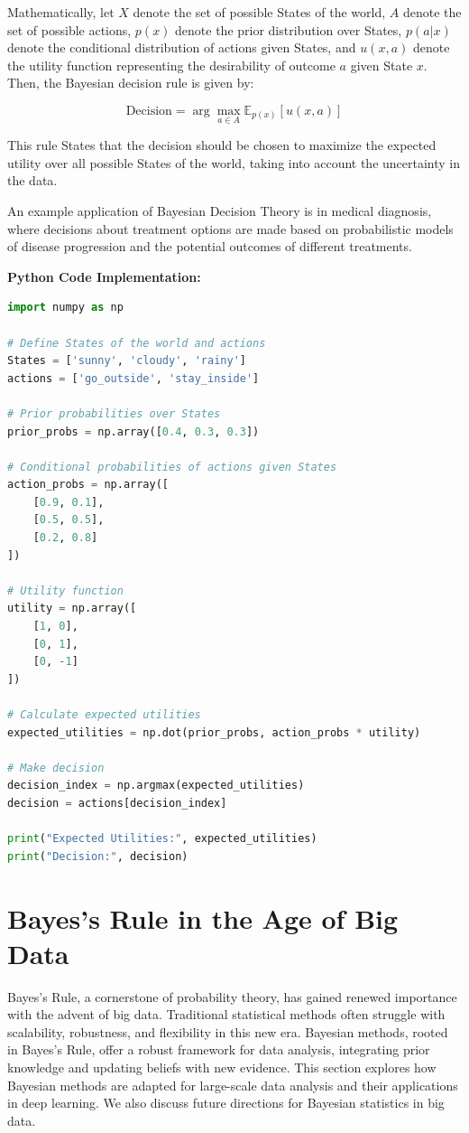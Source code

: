 \documentclass[12pt]{book} %
\begin{document}
Mathematically, let $ X $ denote the set of possible States of the world, $ A $ denote the set of possible actions, $ p(x) $ denote the prior distribution over States, $ p(a|x) $ denote the conditional distribution of actions given States, and $ u(x,a) $ denote the utility function representing the desirability of outcome $ a $ given State $ x $. Then, the Bayesian decision rule is given by:

\[ \text{Decision} = \arg\max_{a \in A} \mathbb{E}_{p(x)}[u(x,a)] \]

This rule States that the decision should be chosen to maximize the expected utility over all possible States of the world, taking into account the uncertainty in the data.

An example application of Bayesian Decision Theory is in medical diagnosis, where decisions about treatment options are made based on probabilistic models of disease progression and the potential outcomes of different treatments.

\textbf{Python Code Implementation:}
\FloatBarrier
\begin{lstlisting}[language=Python, caption=Python Implementation of Bayesian Decision Theory]
import numpy as np

# Define States of the world and actions
States = ['sunny', 'cloudy', 'rainy']
actions = ['go_outside', 'stay_inside']

# Prior probabilities over States
prior_probs = np.array([0.4, 0.3, 0.3])

# Conditional probabilities of actions given States
action_probs = np.array([
    [0.9, 0.1],
    [0.5, 0.5],
    [0.2, 0.8]
])

# Utility function
utility = np.array([
    [1, 0],
    [0, 1],
    [0, -1]
])

# Calculate expected utilities
expected_utilities = np.dot(prior_probs, action_probs * utility)

# Make decision
decision_index = np.argmax(expected_utilities)
decision = actions[decision_index]

print("Expected Utilities:", expected_utilities)
print("Decision:", decision)
\end{lstlisting}


\section{Bayes's Rule in the Age of Big Data}
Bayes's Rule, a cornerstone of probability theory, has gained renewed importance with the advent of big data. Traditional statistical methods often struggle with scalability, robustness, and flexibility in this new era. Bayesian methods, rooted in Bayes's Rule, offer a robust framework for data analysis, integrating prior knowledge and updating beliefs with new evidence. This section explores how Bayesian methods are adapted for large-scale data analysis and their applications in deep learning. We also discuss future directions for Bayesian statistics in big data.
\end{document}
